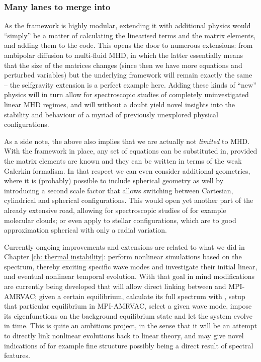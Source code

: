 \subsubsection{Many lanes to merge into}
As the {\legolas} framework is highly modular, extending it with additional physics would ``simply'' be a matter of calculating the linearised terms and the matrix elements, and adding them to the code. This opens the door to numerous extensions: from ambipolar diffusion to multi-fluid MHD, in which the latter essentially means that the size of the matrices changes (since then we have more equations and perturbed variables) but the underlying framework will remain exactly the same -- the selfgravity extension is a perfect example here. Adding these kinds of ``new'' physics will in turn allow for spectroscopic studies of completely uninvestigated linear MHD regimes, and will without a doubt yield novel insights into the stability and behaviour of a myriad of previously unexplored physical configurations.

As a side note, the above also implies that we are actually not \emph{limited} to MHD. With the framework in place, any set of equations can be substituted in, provided the matrix elements are known and they can be written in terms of the weak Galerkin formalism. In that respect we can even consider additional geometries, where it is (probably) possible to include spherical geometry as well by introducing a second scale factor that allows switching between Cartesian, cylindrical and spherical configurations. This would open yet another part of the already extensive road, allowing for spectroscopic studies of for example molecular clouds; or even apply {\legolas} to stellar configurations, which are to good approximation spherical with only a radial variation.

Currently ongoing improvements and extensions are related to what we did in Chapter \ref{ch: thermal instability}: perform nonlinear simulations based on the spectrum, thereby exciting specific wave modes and investigate their initial linear, and eventual nonlinear temporal evolution. With that goal in mind modifications are currently being developed that will allow direct linking between {\legolas} and MPI-AMRVAC; given a certain equilibrium, calculate its full spectrum with {\legolas}, setup that particular equilibrium in MPI-AMRVAC, select a given wave mode, impose its eigenfunctions on the background equilibrium state and let the system evolve in time. This is quite an ambitious project, in the sense that it will be an attempt to directly link nonlinear evolutions back to linear theory, and may give novel indications of for example fine structure possibly being a direct result of spectral features.


